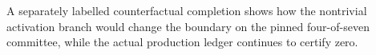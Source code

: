 A separately labelled counterfactual completion shows how the nontrivial
activation branch would change the boundary on the pinned four-of-seven
committee, while the actual production ledger continues to certify zero.
